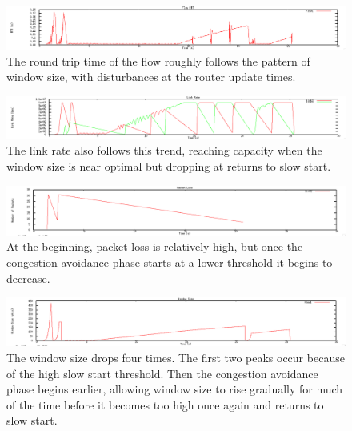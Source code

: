 \documentclass[12pt]{article}
\begin{document}
\begin{figure}[!ht]
\centering \includegraphics[bb= 0 0 1300 250, scale=.35]{figures/Test1_Tahoe/flow_rtt.png}
\caption{The round trip time of the flow roughly follows the pattern of window size, with disturbances at the router update times.}
\label{fig:test1_tahoe_flow_rtt}
\end{figure}

\begin{figure}[!ht]
\centering \includegraphics[bb= 0 0 1300 250, scale=.35]{figures/Test1_Tahoe/link_rate.png}
\caption{The link rate also follows this trend, reaching capacity when the window size is near optimal but dropping at returns to slow start.}
\label{fig:test1_tahoe_link_rate}
\end{figure}

\begin{figure}[!ht]
\centering \includegraphics[bb= 0 0 1300 250, scale=.35]{figures/Test1_Tahoe/packet_loss.png}
\caption{At the beginning, packet loss is relatively high, but once the congestion avoidance phase starts at a lower threshold it begins to decrease.}
\label{fig:test1_tahoe_packet_loss}
\end{figure}

\begin{figure}[!ht]
\centering \includegraphics[bb= 0 0 1300 250, scale=.35]{figures/Test1_Tahoe/window_size.png}
\caption{The window size drops four times. The first two peaks occur because of the high slow start threshold. Then the congestion avoidance phase begins earlier, allowing window size to rise gradually for much of the time before it becomes too high once again and returns to slow start.}
\label{fig:test1_tahoe_window_size}
\end{figure}
\end{document}
